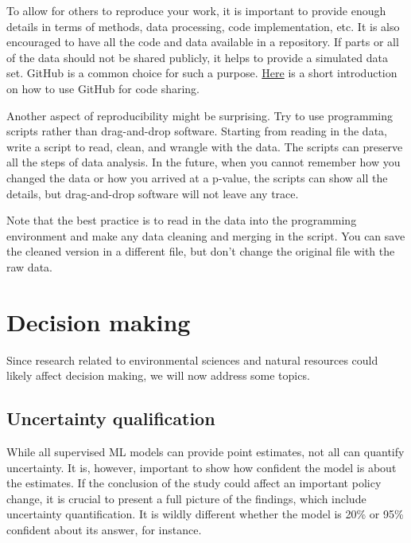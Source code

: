 \documentclass[
]{book}
\begin{document}
To allow for others to reproduce your work, it is important to provide enough details in terms of methods, data processing, code implementation, etc. It is also encouraged to have all the code and data available in a repository. If parts or all of the data should not be shared publicly, it helps to provide a simulated data set. GitHub is a common choice for such a purpose. \href{https://imperialcollegelondon.github.io/grad_school_git_course/l2-01-sharing_your_code/index.html}{Here} is a short introduction on how to use GitHub for code sharing.

Another aspect of reproducibility might be surprising. Try to use programming scripts rather than drag-and-drop software. Starting from reading in the data, write a script to read, clean, and wrangle with the data. The scripts can preserve all the steps of data analysis. In the future, when you cannot remember how you changed the data or how you arrived at a p-value, the scripts can show all the details, but drag-and-drop software will not leave any trace.

Note that the best practice is to read in the data into the programming environment and make any data cleaning and merging in the script. You can save the cleaned version in a different file, but don't change the original file with the raw data.

\hypertarget{decision-making}{%
\section{Decision making}\label{decision-making}}

Since research related to environmental sciences and natural resources could likely affect decision making, we will now address some topics.

\hypertarget{uncertainty-qualification}{%
\subsection{Uncertainty qualification}\label{uncertainty-qualification}}

While all supervised ML models can provide point estimates, not all can quantify uncertainty. It is, however, important to show how confident the model is about the estimates. If the conclusion of the study could affect an important policy change, it is crucial to present a full picture of the findings, which include uncertainty quantification. It is wildly different whether the model is 20\% or 95\% confident about its answer, for instance.
\end{document}
